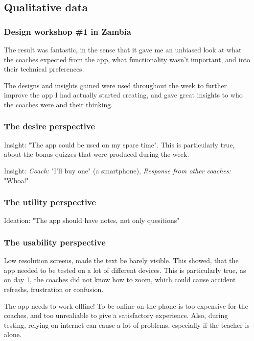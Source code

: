 \subsection{Qualitative data}

\subsubsection{Design workshop \#1 in Zambia}

The result was fantastic, in the sense that it gave me an unbiased look at what the coaches expected from the app, what functionality wasn't important, and into their technical preferences.

The designs and insights gained were used throughout the week to further improve the app I had actually started creating, and gave great insights to who the coaches were and their thinking. 

\subsubsection{The desire perspective}

Insight: "The app could be used on my spare time". This is particularly true, about the bonus quizzes that were produced during the week.

Insight: \textit{Coach:} "I'll buy one" (a smartphone), \textit{Response from other coaches: } "Whoa!"

\subsubsection{The utility perspective}

Ideation: "The app should have notes, not only quesitions"

\subsubsection{The usability perspective}

Low resolution screens, made the text be barely visible. This showed, that the app needed to be tested on a lot of different devices. This is particularly true, as on day 1, the coaches did not know how to zoom, which could cause accident refreshs, frustration or confusion.

The app needs to work offline! To be online on the phone is too expensive for the coaches, and too unrealiable to give a satisfactory experience. Also, during testing, relying on internet can cause a lot of problems, especially if the teacher is alone.

